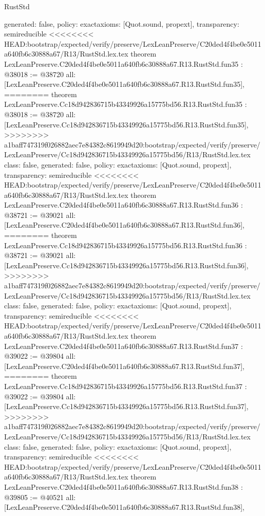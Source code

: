\begin{lexlean}{RustStd}
\begin{coremodule}
{\begin{coremodule}
{{{{{{{{{{{{{{{{{{{{{{{{{{{{{{{{{{{{{{  generated: false,
  policy: exact{axioms: [Quot.sound, propext]},
  transparency: semireducible
}
<<<<<<<< HEAD:bootstrap/expected/verify/preserve/LexLeanPreserve/C20ded4f4be0e5011a640fb6c30888a67/R13/RustStd.lex.tex
theorem LexLeanPreserve.C20ded4f4be0e5011a640fb6c30888a67.R13.RustStd.fun35 : @38018 := @38720 {
  all: [LexLeanPreserve.C20ded4f4be0e5011a640fb6c30888a67.R13.RustStd.fun35],
========
theorem LexLeanPreserve.Cc18d942836715b43349926a15775bd56.R13.RustStd.fun35 : @38018 := @38720 {
  all: [LexLeanPreserve.Cc18d942836715b43349926a15775bd56.R13.RustStd.fun35],
>>>>>>>> a1baff747319f026882aec7e84382c8619949d20:bootstrap/expected/verify/preserve/LexLeanPreserve/Cc18d942836715b43349926a15775bd56/R13/RustStd.lex.tex
  class: false,
  generated: false,
  policy: exact{axioms: [Quot.sound, propext]},
  transparency: semireducible
}
<<<<<<<< HEAD:bootstrap/expected/verify/preserve/LexLeanPreserve/C20ded4f4be0e5011a640fb6c30888a67/R13/RustStd.lex.tex
theorem LexLeanPreserve.C20ded4f4be0e5011a640fb6c30888a67.R13.RustStd.fun36 : @38721 := @39021 {
  all: [LexLeanPreserve.C20ded4f4be0e5011a640fb6c30888a67.R13.RustStd.fun36],
========
theorem LexLeanPreserve.Cc18d942836715b43349926a15775bd56.R13.RustStd.fun36 : @38721 := @39021 {
  all: [LexLeanPreserve.Cc18d942836715b43349926a15775bd56.R13.RustStd.fun36],
>>>>>>>> a1baff747319f026882aec7e84382c8619949d20:bootstrap/expected/verify/preserve/LexLeanPreserve/Cc18d942836715b43349926a15775bd56/R13/RustStd.lex.tex
  class: false,
  generated: false,
  policy: exact{axioms: [Quot.sound, propext]},
  transparency: semireducible
}
<<<<<<<< HEAD:bootstrap/expected/verify/preserve/LexLeanPreserve/C20ded4f4be0e5011a640fb6c30888a67/R13/RustStd.lex.tex
theorem LexLeanPreserve.C20ded4f4be0e5011a640fb6c30888a67.R13.RustStd.fun37 : @39022 := @39804 {
  all: [LexLeanPreserve.C20ded4f4be0e5011a640fb6c30888a67.R13.RustStd.fun37],
========
theorem LexLeanPreserve.Cc18d942836715b43349926a15775bd56.R13.RustStd.fun37 : @39022 := @39804 {
  all: [LexLeanPreserve.Cc18d942836715b43349926a15775bd56.R13.RustStd.fun37],
>>>>>>>> a1baff747319f026882aec7e84382c8619949d20:bootstrap/expected/verify/preserve/LexLeanPreserve/Cc18d942836715b43349926a15775bd56/R13/RustStd.lex.tex
  class: false,
  generated: false,
  policy: exact{axioms: [Quot.sound, propext]},
  transparency: semireducible
}
<<<<<<<< HEAD:bootstrap/expected/verify/preserve/LexLeanPreserve/C20ded4f4be0e5011a640fb6c30888a67/R13/RustStd.lex.tex
theorem LexLeanPreserve.C20ded4f4be0e5011a640fb6c30888a67.R13.RustStd.fun38 : @39805 := @40521 {
  all: [LexLeanPreserve.C20ded4f4be0e5011a640fb6c30888a67.R13.RustStd.fun38],
}}}}}}}}}}}}}}}}}}}}}}}}}}}}}}}}}}}}}}}}}
\end{coremodule}}
\end{coremodule}
\end{lexlean}
